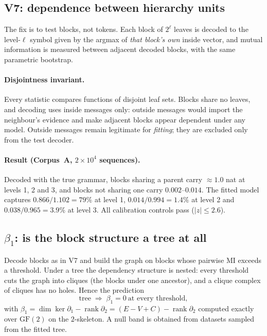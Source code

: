 \subsection{V7: dependence between hierarchy units}

The fix is to test blocks, not tokens. Each block of $2^\ell$ leaves is decoded
to the level-$\ell$ symbol given by the argmax of \emph{that block's own}
inside vector, and mutual information is measured between adjacent decoded
blocks, with the same parametric bootstrap.

\paragraph{Disjointness invariant.}
Every statistic compares functions of disjoint leaf sets. Blocks share no
leaves, and decoding uses inside messages only: outside messages would import
the neighbour's evidence and make adjacent blocks appear dependent under any
model. Outside messages remain legitimate for \emph{fitting}; they are excluded
only from the test decoder.

\paragraph{Result (Corpus~A, $2\times10^4$ sequences).}
Decoded with the true grammar, blocks sharing a parent carry $\approx 1.0$ nat
at levels 1, 2 and 3, and blocks not sharing one carry $0.002$--$0.014$. The
fitted model captures $0.866/1.102 = 79\%$ at level 1, $0.014/0.994 = 1.4\%$ at
level 2 and $0.038/0.965 = 3.9\%$ at level 3. All calibration controls pass
($|z| \le 2.6$).

\subsection{$\beta_1$: is the block structure a tree at all}

Decode blocks as in V7 and build the graph on blocks whose pairwise MI exceeds
a threshold. Under a tree the dependency structure is nested: every threshold
cuts the graph into cliques (the blocks under one ancestor), and a clique
complex of cliques has no holes. Hence the prediction
\begin{equation}
  \text{tree} \;\Longrightarrow\; \beta_1 = 0 \ \text{at every threshold},
  \label{eq:betti}
\end{equation}
with $\beta_1 = \dim\ker\partial_1 - \operatorname{rank}\partial_2 =
(E-V+C) - \operatorname{rank}\partial_2$ computed exactly over $\mathrm{GF}(2)$
on the $2$-skeleton. A null band is obtained from datasets sampled from the
fitted tree.

